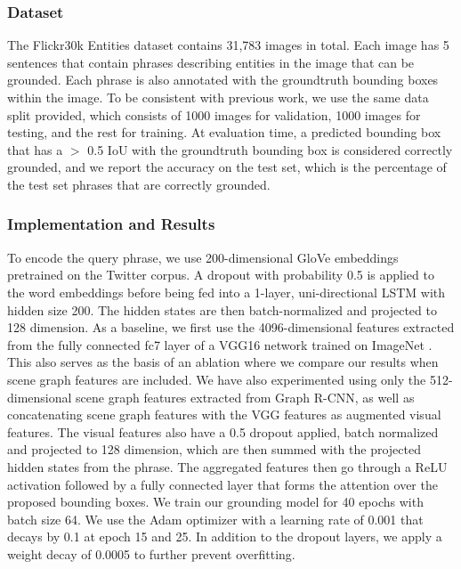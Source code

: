 \subsubsection{Dataset}
The Flickr30k Entities dataset \cite{plummer2015flickr30k} contains 31,783 images in total. Each image has 5 sentences that contain phrases describing entities in the image that can be grounded. Each phrase is also annotated with the groundtruth bounding boxes within the image. To be consistent with previous work, we use the same data split provided, which consists of 1000 images for validation, 1000 images for testing, and the rest for training. At evaluation time, a predicted bounding box that has a $>$ 0.5 IoU with the groundtruth bounding box is considered correctly grounded, and we report the accuracy on the test set, which is the percentage of the test set phrases that are correctly grounded. 

\subsubsection{Implementation and Results}


To encode the query phrase, we use 200-dimensional GloVe \cite{pennington2014glove} embeddings pretrained on the Twitter corpus. A dropout with probability 0.5 is applied to the word embeddings before being fed into a 1-layer, uni-directional LSTM with hidden size 200. The hidden states are then batch-normalized and projected to 128 dimension. As a baseline, we first use the 4096-dimensional features extracted from the fully connected fc7 layer of a VGG16 network\cite{simonyan2014very} trained on ImageNet \cite{krizhevsky2012imagenet}. This also serves as the basis of an ablation where we compare our results when scene graph features are included. We have also experimented using only the 512-dimensional scene graph features extracted from Graph R-CNN, as well as concatenating scene graph features with the VGG features as augmented visual features. The visual features also have a 0.5 dropout applied, batch normalized and projected to 128 dimension, which are then summed with the projected hidden states from the phrase. The aggregated features then go through a ReLU activation followed by a fully connected layer that forms the attention over the proposed bounding boxes. We train our grounding model for 40 epochs with batch size 64. We use the Adam optimizer \cite{kingma2014adam} with a learning rate of 0.001 that decays by 0.1 at epoch 15 and 25. In addition to the dropout layers, we apply a weight decay of 0.0005 to further prevent overfitting.

